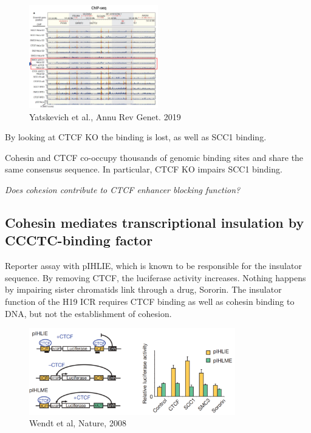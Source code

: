 \begin{figure}
\centering
\includegraphics[width=0.5\textwidth]{../_resources/Screenshot_2022-10-14_at_19-51-43.png}
\caption{Yatskevich et al., Annu Rev Genet. 2019}
\label{fig:chip}
\end{figure}

By looking at CTCF KO the binding is lost, as well as SCC1 binding.

Cohesin and CTCF co-occupy thousands of genomic binding sites and share the same consensus sequence. In particular, CTCF KO impairs SCC1 binding.

\emph{Does cohesion contribute to CTCF enhancer blocking function?}

\subsection{Cohesin mediates transcriptional insulation by CCCTC-binding factor}

Reporter assay with pIHLIE, which is known to be responsible for the insulator sequence. By removing CTCF, the luciferase activity increases. Nothing happens by impairing sister chromatids link through a drug, Sororin. The insulator function of the H19 ICR requires CTCF binding as well as cohesin binding to DNA, but not the establishment of cohesion.

\begin{figure}
\centering
\includegraphics[width=0.8\textwidth]{../_resources/Screenshot_2022-10-14_at_19-50-44.png}
\caption{Wendt et al, Nature, 2008}
\end{figure}

